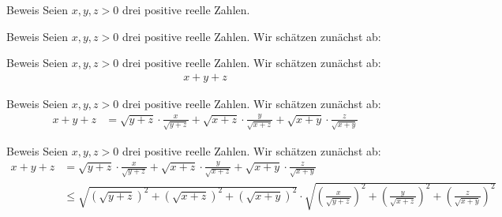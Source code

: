 \documentclass[10pt]{beamer}
\begin{document}
\begin{frame}{Beweis}
    Seien \( x, y, z > 0 \) drei positive reelle Zahlen.
\end{frame}



\begin{frame}{Beweis}
    Seien \( x, y, z > 0 \) drei positive reelle Zahlen. Wir schätzen zunächst ab:
\end{frame}



\begin{frame}{Beweis}
    Seien \( x, y, z > 0 \) drei positive reelle Zahlen. Wir schätzen zunächst ab:
    \begin{align*}
        x + y + z
    \end{align*}
\end{frame}



\begin{frame}{Beweis}
    Seien \( x, y, z > 0 \) drei positive reelle Zahlen. Wir schätzen zunächst ab:
    \begin{align*}
        x + y + z
        & = \sqrt{y + z} \cdot \frac{x}{\sqrt{y + z}} + \sqrt{x + z} \cdot \frac{y}{\sqrt{x + z}} + \sqrt{x + y} \cdot \frac{z}{\sqrt{x + y}}
    \end{align*}
\end{frame}



\begin{frame}{Beweis}
    Seien \( x, y, z > 0 \) drei positive reelle Zahlen. Wir schätzen zunächst ab:
    {\footnotesize
    \begin{align*}
        x + y + z
        & = \sqrt{y + z} \cdot \frac{x}{\sqrt{y + z}} + \sqrt{x + z} \cdot \frac{y}{\sqrt{x + z}} + \sqrt{x + y} \cdot \frac{z}{\sqrt{x + y}} \\
        & \leq \sqrt{\left( \sqrt{y + z} \right)^{2} + \left( \sqrt{x + z} \right)^{2} + \left( \sqrt{x + y} \right)^{2}} \cdot \sqrt{\left( \frac{x}{\sqrt{y + z}}\right)^{2} + \left( \frac{y}{\sqrt{x + z}}\right)^{2} + \left( \frac{z}{\sqrt{x + y}}\right)^{2}}
    \end{align*}
    }
\end{frame}
\end{document}
